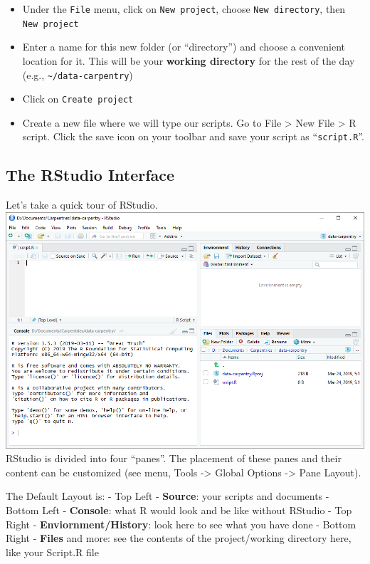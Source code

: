 \documentclass[]{book}
\providecommand{\tightlist}{%
  \setlength{\itemsep}{0pt}\setlength{\parskip}{0pt}}
\begin{document}
\begin{itemize}
\tightlist
\item
  Under the \texttt{File} menu, click on \texttt{New\ project}, choose
  \texttt{New\ directory}, then \texttt{New\ project}
\item
  Enter a name for this new folder (or ``directory'') and choose a
  convenient location for it. This will be your \textbf{working
  directory} for the rest of the day (e.g.,
  \texttt{\textasciitilde{}/data-carpentry})
\item
  Click on \texttt{Create\ project}
\item
  Create a new file where we will type our scripts. Go to File
  \textgreater{} New File \textgreater{} R script. Click the save icon
  on your toolbar and save your script as ``\texttt{script.R}''.
\end{itemize}

\subsection{The RStudio Interface}\label{the-rstudio-interface}

Let's take a quick tour of RStudio.
\includegraphics{../fig/R_00_Rstudio_01.png} RStudio is divided into
four ``panes''. The placement of these panes and their content can be
customized (see menu, Tools -\textgreater{} Global Options
-\textgreater{} Pane Layout).

The Default Layout is: - Top Left - \textbf{Source}: your scripts and
documents - Bottom Left - \textbf{Console}: what R would look and be
like without RStudio - Top Right - \textbf{Enviornment/History}: look
here to see what you have done - Bottom Right - \textbf{Files} and more:
see the contents of the project/working directory here, like your
Script.R file
\end{document}
